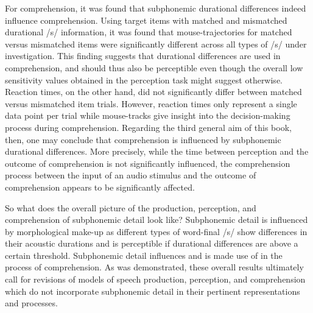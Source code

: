 For comprehension, it was found that subphonemic durational differences indeed influence comprehension. Using target items with matched and mismatched durational /s/ information, it was found that mouse-trajectories for matched versus mismatched items were significantly different across all types of /s/ under investigation. This finding suggests that durational differences are used in comprehension, and should thus also be perceptible even though the overall low sensitivity values obtained in the perception task might suggest otherwise. Reaction times, on the other hand, did not significantly differ between matched versus mismatched item trials. However, reaction times only represent a single data point per trial while mouse-tracks give insight into the decision-making process during comprehension. Regarding the third general aim of this book, then, one may conclude that comprehension is influenced by subphonemic durational differences. More precisely, while the time between perception and the outcome of comprehension is not significantly influenced, the comprehension process between the input of an audio stimulus and the outcome of comprehension appears to be significantly affected.

So what does the overall picture of the production, perception, and comprehension of subphonemic detail look like? Subphonemic detail is influenced by morphological make-up as different types of word-final /s/ show differences in their acoustic durations and is perceptible if durational differences are above a certain threshold. Subphonemic detail influences and is made use of in the process of comprehension. As was demonstrated, these overall results ultimately call for revisions of models of speech production, perception, and comprehension which do not incorporate subphonemic detail in their pertinent representations and processes.  
